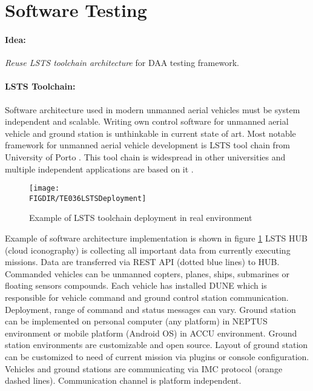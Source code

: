 \section{Software Testing}\label{s:TestingFrameworkTheory}

\paragraph{Idea:} \emph{Reuse LSTS toolchain architecture} for DAA testing framework.

\paragraph{LSTS Toolchain:} Software architecture used in modern unmanned aerial vehicles must be system independent and scalable. Writing own control software for unmanned aerial vehicle and ground station is unthinkable in current state of art.  Most notable framework for unmanned aerial vehicle development is LSTS tool chain from University of Porto \cite{merani2011underwater}. This tool chain is widespread in other universities and multiple independent applications are based on it \cite{rajan2013towards}.

\begin{figure}[H]
    \centering
    \texttt{[image: \\FIGDIR/TE036LSTSDeployment]}
    \caption{Example of LSTS toolchain deployment in real environment \cite{pinto2006neptus}}
    \label{fig:lstsdeployment}
\end{figure}

Example of software architecture implementation is shown in figure \ref{fig:lstsdeployment} LSTS HUB (cloud iconography) is collecting all important data from currently executing missions. Data are transferred via REST API (dotted blue lines) to HUB.  Commanded vehicles can be unmanned copters, planes, ships, submarines or floating sensors compounds. Each vehicle has installed DUNE which is responsible for vehicle command and ground control station communication. Deployment, range of command and status messages can vary. Ground station can be implemented on personal computer (any platform) in NEPTUS environment or mobile platform (Android OS) in ACCU environment. Ground station environments are customizable and open source. Layout of ground station can be customized to need of current mission via plugins or console configuration. Vehicles and ground stations are communicating via IMC protocol (orange dashed lines). Communication channel is platform independent.


